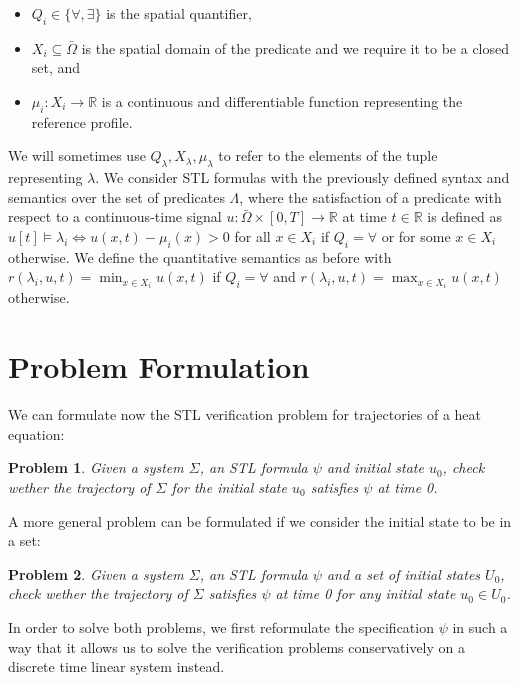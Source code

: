 \documentclass{article}
\newtheorem{problem}{Problem}
\newcommand*{\R}{\mathbb{R}}
\begin{document}
\begin{itemize}
    \item $Q_i \in \{\forall, \exists\}$ is the spatial quantifier,
    \item $X_i \subseteq \bar\Omega$ is the spatial domain of the predicate and
        we require it to be a closed set, and 
    \item $\mu_i : X_i \to \R$ is a continuous and differentiable function 
        representing the reference profile.
\end{itemize}

We will sometimes use $Q_\lambda, X_\lambda, \mu_\lambda$ to refer to the
elements of the tuple representing $\lambda$. We consider STL formulas 
with the previously defined syntax and semantics 
over the set of predicates $\Lambda$, where the satisfaction of a
predicate with respect to a continuous-time signal $u : \bar\Omega \times [0, T]
\to \R$ at time $t \in \R$ is defined as $u[t] \models \lambda_i \iff 
u(x, t) - \mu_i(x) > 0$ for all $x \in X_i$ if $Q_i = \forall$ or for some $x \in
X_i$ otherwise. We define the quantitative semantics as before with
$r(\lambda_i,u, t) = \min_{x \in X_i} u(x, t)$ if $Q_i = \forall$ and
$r(\lambda_i,u, t) = \max_{x \in X_i} u(x, t)$ otherwise.

\section{Problem Formulation}
\label{sec:problem_formulation}

We can formulate now the STL verification problem for trajectories of a heat
equation:

\begin{problem}
\label{pr:stl}
    Given a system $\Sigma$, an STL formula $\psi$ and initial state $u_0$,
    check wether the trajectory of $\Sigma$ for the initial state $u_0$
    satisfies $\psi$ at time 0.
\end{problem}

A more general problem can be formulated if we consider the initial state to be
in a set:

\begin{problem}
\label{pr:stl_set}
    Given a system $\Sigma$, an STL formula $\psi$ and a set of initial states
    $U_0$, check wether the trajectory of $\Sigma$ satisfies $\psi$ at time 0
    for any initial state $u_0 \in U_0$.
\end{problem}

In order to solve both problems, we first reformulate the specification $\psi$
in such a way that it allows us to solve the verification problems
conservatively on a discrete time linear system instead.
\end{document}
